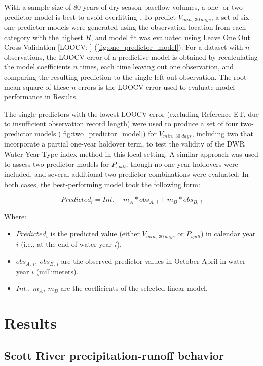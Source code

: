 \documentclass[hess, manuscript]{copernicus}
\providecommand{\tightlist}{%
  \setlength{\itemsep}{0pt}\setlength{\parskip}{0pt}}
\begin{document}
With a sample size of 80 years of dry season baseflow volumes, a one- or
two-predictor model is best to avoid overfitting \citep{James2013}. To
predict \(V_{min,~30~days}\), a set of six one-predictor models were
generated using the observation location from each category with the
highest \(R\), and model fit was evaluated using Leave One Out Cross
Validation {[}LOOCV; \citet{James2013}{]}
(\autoref{fig:one_predictor_model}). For a dataset with \(n\)
observations, the LOOCV error of a predictive model is obtained by
recalculating the model coefficients \(n\) times, each time leaving out
one observation, and comparing the resulting prediction to the single
left-out observation. The root mean square of these \(n\) errors is the
LOOCV error used to evaluate model performance in Results.

The single predictors with the lowest LOOCV error (excluding Reference
ET, due to insufficient observation record length) were used to produce
a set of four two-predictor models (\autoref{fig:two_predictor_model})
for \(V_{min,~30~days}\), including two that incorporate a partial
one-year holdover term, to test the validity of the DWR Water Year Type
index method in this local setting. A similar approach was used to
assess two-predictor models for \(P_{spill}\), though no one-year
holdovers were included, and several additional two-predictor
combinations were evaluated. In both cases, the best-performing model
took the following form:

\[Predicted_{i} = Int. + m_A * obs_{A,~i}+m_B*obs_{B,~i}\]

Where:

\begin{itemize}
\tightlist
\item
  \(Predicted_i\) is the predicted value (either \(V_{min,~30~days}\) or
  \(P_{spill}\)) in calendar year \(i\) (i.e., at the end of water year
  \(i\)).
\item
  \(obs_{A,~i},~obs_{B,~i}\) are the observed predictor values in
  October-April in water year \(i\) (millimeters).
\item
  \(Int.,~m_A,~m_B\) are the coefficients of the selected linear model.
\end{itemize}

\section{Results}

\subsection{Scott River precipitation-runoff behavior}
\end{document}

